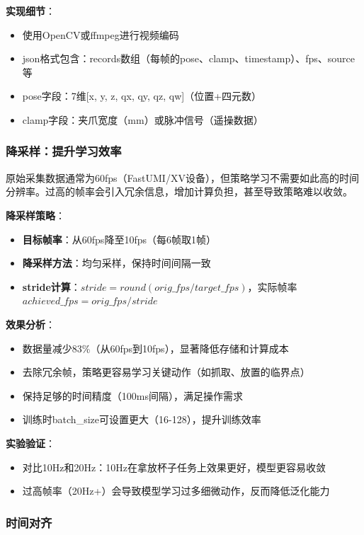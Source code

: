 \textbf{实现细节}：
\begin{itemize}[leftmargin=2em]
    \item 使用OpenCV或ffmpeg进行视频编码
    \item json格式包含：records数组（每帧的pose、clamp、timestamp）、fps、source等
    \item pose字段：7维[x, y, z, qx, qy, qz, qw]（位置+四元数）
    \item clamp字段：夹爪宽度（mm）或脉冲信号（遥操数据）
\end{itemize}

\subsubsection{降采样：提升学习效率}

原始采集数据通常为60fps（FastUMI/XV设备），但策略学习不需要如此高的时间分辨率。过高的帧率会引入冗余信息，增加计算负担，甚至导致策略难以收敛。

\textbf{降采样策略}：
\begin{itemize}[leftmargin=2em]
    \item \textbf{目标帧率}：从60fps降至10fps（每6帧取1帧）
    \item \textbf{降采样方法}：均匀采样，保持时间间隔一致
    \item \textbf{stride计算}：$stride = round(orig\_fps / target\_fps)$，实际帧率 $achieved\_fps = orig\_fps / stride$
\end{itemize}

\textbf{效果分析}：
\begin{itemize}[leftmargin=2em]
    \item 数据量减少83\%（从60fps到10fps），显著降低存储和计算成本
    \item 去除冗余帧，策略更容易学习关键动作（如抓取、放置的临界点）
    \item 保持足够的时间精度（100ms间隔），满足操作需求
    \item 训练时batch\_size可设置更大（16-128），提升训练效率
\end{itemize}

\textbf{实验验证}：
\begin{itemize}[leftmargin=2em]
    \item 对比10Hz和20Hz：10Hz在拿放杯子任务上效果更好，模型更容易收敛
    \item 过高帧率（20Hz+）会导致模型学习过多细微动作，反而降低泛化能力
\end{itemize}

\subsubsection{时间对齐}

